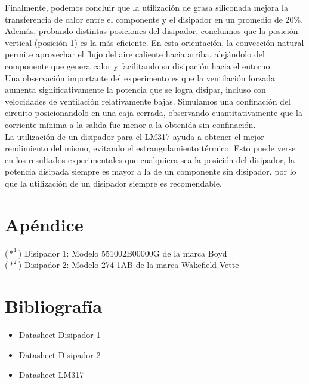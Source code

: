 \documentclass[conference]{IEEEtran}
\begin{document}
    Finalmente, podemos concluir que la utilización de grasa siliconada mejora la transferencia de calor entre el
    componente y el disipador en un promedio de 20\%. 
    \\Además, probando distintas posiciones del disipador, concluimos que la posición vertical (posición 1) es la más eficiente.
    En esta orientación, la convección natural permite aprovechar el flujo del aire caliente hacia arriba, alejándolo del componente que 
    genera calor y facilitando su disipación hacia el entorno.\\Una observación importante del experimento
    es que la ventilación forzada aumenta significativamente la potencia que se logra disipar, incluso con velocidades de ventilación relativamente bajas.
    Simulamos una confinación del circuito posicionandolo
    en una caja cerrada, observando cuantitativamente que la corriente mínima a la salida fue menor a la obtenida sin confinación.
    \\La utilización de un disipador para el LM317 ayuda a obtener el mejor rendimiento del mismo, evitando el estrangulamiento
    térmico. Esto puede verse en los resultados
    experimentales que cualquiera sea la posición del disipador, la potencia disipada siempre es mayor a la de un
    componente sin disipador, por lo que la utilización de un disipador siempre es recomendable.

    \section{Apéndice}
    ($*^1$) Disipador 1: Modelo 551002B00000G de la marca Boyd \\
    ($*^2$) Disipador 2: Modelo 274-1AB de la marca Wakefield-Vette \\
    \section{Bibliografía}
    \begin{itemize}
        \item \href{https://www.digikey.com/en/products/detail/wakefield-vette/274-1AB/340321}{Datasheet Disipador 1}
        \item \href{https://es.farnell.com/boyd/551002b00000g/heat-sink/dp/1339511}{Datasheet Disipador 2}
        \item \href{https://www.alldatasheet.es/datasheet-pdf/pdf/22749/STMICROELECTRONICS/LM317.html}{Datasheet LM317}
    \end{itemize}
\end{document}
